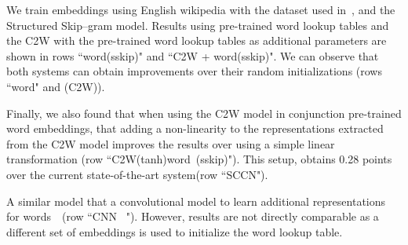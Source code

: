 \documentclass[11pt]{article}
\begin{document}
\begin{CJK*}{UTF8}{gbsn}
We train embeddings using English wikipedia with the dataset used in~\cite{Ling:2015:naacl}, and the Structured Skip--gram model. Results using pre-trained word lookup tables and the C2W with the pre-trained word lookup tables as additional parameters are shown in rows ``word(sskip)" and ``C2W + word(sskip)". We can observe that both systems can obtain improvements over their random initializations (rows ``word" and (C2W)). 

Finally, we also found that when using the C2W model in conjunction pre-trained word embeddings, that adding a non-linearity to the representations extracted from the C2W model  improves the results over using a simple linear transformation (row ``C2W(tanh)word~(sskip)"). This setup, obtains 0.28 points over the current state-of-the-art system(row ``SCCN").

A similar model that a convolutional model to learn additional representations for words~\cite{icml2014c2_santos14}~(row ``CNN~
\cite{icml2014c2_santos14}"). However, results are not directly comparable as a different set of embeddings is used to initialize the word lookup table.




\begin{table}
\begin{center}
\end{center}
\caption{\label{wsjstate} POS accuracy result comparison with state-of-the-art systems for the English PTB.}
\end{table}


\end{CJK*}
\end{document}
